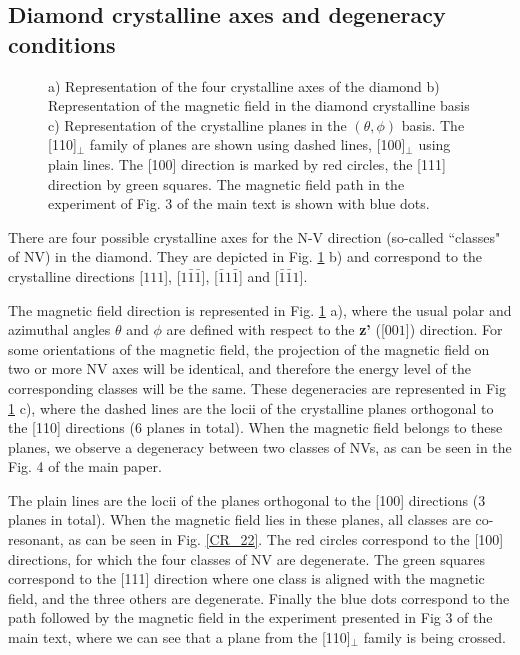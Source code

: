 \documentclass[preprintnumbers,amsmath,amssymb,onecolumn,12pt]{revtex4}
\begin{document}
\subsection{Diamond crystalline axes and degeneracy conditions}
\begin{figure}[!ht]
  \centering {}
  \caption{a) Representation of the four crystalline axes of the diamond b) Representation of the magnetic field in the diamond crystalline basis c) Representation of the crystalline planes in the $(\theta , \phi)$ basis. The [110]$_\perp$ family of planes are shown using dashed lines, [100]$_\perp$ using plain lines. The [100] direction is marked by red circles, the [111] direction by green squares. The magnetic field path in the experiment of Fig. 3 of the main text is shown with blue dots.}
	\label{cristallo}
\end{figure}
There are four possible crystalline axes for the N-V direction (so-called ``classes" of NV) in the diamond. They are depicted in Fig. \ref{cristallo} b) and correspond to the crystalline directions [$111$], [$1\bar 1 \bar 1$], [$\bar 1 1 \bar 1$] and [$\bar 1 \bar 1 1$]. 

The magnetic field direction is represented in Fig. \ref{cristallo} a), where the usual polar and azimuthal angles $\theta$ and $\phi$ are defined with respect to the \textbf{z'} ([$001$]) direction. For some orientations of the magnetic field, the projection of the magnetic field on two or more NV axes will be identical, and therefore the energy level of the corresponding classes will be the same. These degeneracies are represented in Fig \ref{cristallo} c), where the dashed lines are the locii of the crystalline planes orthogonal to the [110] directions (6 planes in total). When the magnetic field belongs to these planes, we observe a degeneracy between two classes of NVs, as can be seen in the Fig. 4 of the main paper.

The plain lines are the locii of the planes orthogonal to the [100] directions (3 planes in total). When the magnetic field lies in these planes, all classes are co-resonant, as can be seen in Fig. \ref{CR_22}.
The red circles correspond to the [100] directions, for which the four classes of NV are degenerate. The green squares correspond to the [111] direction where one class is aligned with the magnetic field, and the three others are degenerate. Finally the blue dots correspond to the path followed by the magnetic field in the experiment presented in Fig 3 of the main text, where we can see that a plane from the [110]$_\perp$ family is being crossed.
\end{document}
